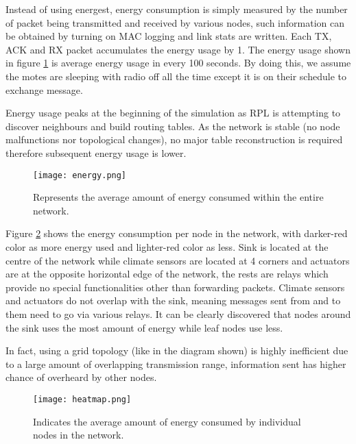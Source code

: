 \documentclass[12pt, oneside, a4paper]{article}
\begin{document}
    Instead of using energest, energy consumption is simply measured by the number of packet being transmitted and received by various nodes, such information can be obtained by turning on MAC logging and link stats are written. Each TX, ACK and RX packet accumulates the energy usage by 1. The energy usage shown in figure \ref{energy} is average energy usage in every 100 seconds. By doing this, we assume the motes are sleeping with radio off all the time except it is on their schedule to exchange message. 

    Energy usage peaks at the beginning of the simulation as RPL is attempting to discover neighbours and build routing tables. As the network is stable (no node malfunctions nor topological changes), no major table reconstruction is required therefore subsequent energy usage is lower. 

    \begin{figure}[H]
        \centering
        \texttt{[image: energy.png]}
        \caption{Represents the average amount of energy consumed within the entire network.}
        \label{energy}
    \end{figure}

    Figure \ref{heatmap} shows the energy consumption per node in the network, with darker-red color as more energy used and lighter-red color as less. Sink is located at the centre of the network while climate sensors are located at 4 corners and actuators are at the opposite horizontal edge of the network, the rests are relays which provide no special functionalities other than forwarding packets. Climate sensors and actuators do not overlap with the sink, meaning messages sent from and to them need to go via various relays. It can be clearly discovered that nodes around the sink uses the most amount of energy while leaf nodes use less.

    In fact, using a grid topology (like in the diagram shown) is highly inefficient due to a large amount of overlapping transmission range, information sent has higher chance of overheard by other nodes. 

    \begin{figure}[H]
        \centering
        \texttt{[image: heatmap.png]}
        \caption{Indicates the average amount of energy consumed by individual nodes in the network.}
        \label{heatmap}
    \end{figure}
\end{document}

